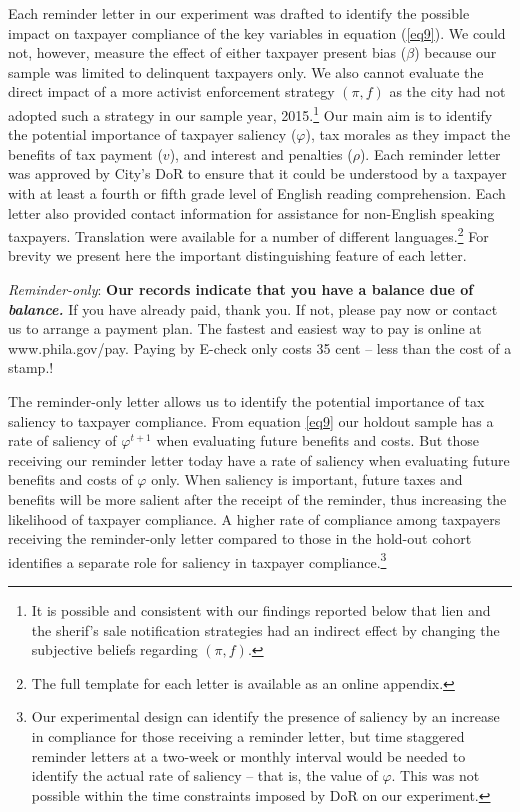 \documentclass[12pt]{article}
\begin{document}
Each reminder letter in our experiment was drafted to identify the
possible impact on taxpayer compliance of the key variables in
equation (\ref{eq9}).  We could not, however, measure the effect of
either taxpayer present bias ($\beta$) because our sample was limited
to delinquent taxpayers only. We also cannot evaluate the direct
impact of a more activist enforcement strategy $(\pi, f)$ as the city
had not adopted such a strategy in our sample year, 2015.\footnote{It
  is possible and consistent with our findings reported below that
  lien and the sherif's sale notification strategies had an indirect
  effect by changing the subjective beliefs regarding $(\pi,f)$.} Our
main aim is to identify the potential importance of taxpayer saliency
($\varphi$), tax morales as they impact the benefits of tax payment
($v$), and interest and penalties ($\rho$).  Each reminder letter was
approved by City's DoR to ensure that it could be understood by a
taxpayer with at least a fourth or fifth grade level of English
reading comprehension.  Each letter also provided contact information
for assistance for non-English speaking taxpayers.  Translation were
available for a number of different languages.\footnote{The full
  template for each letter is available as an online appendix.}  For
brevity we present here the important distinguishing feature of each
letter.

\bigskip

\noindent \textit{Reminder-only}: \textbf{Our records indicate 
that you have a balance due of \textit{balance. }} If you have 
already paid, thank you.  If not, please pay now or contact us 
to arrange a payment plan.  The fastest and easiest way to pay is 
online at  www.phila.gov/pay. Paying by E-check only costs 35 cent 
-- less than the cost of a stamp.!

\bigskip

 The reminder-only letter allows us to identify the potential
 importance of tax saliency to taxpayer compliance.  From equation
 \eqref{eq9} our holdout sample has a rate of saliency of
 $\varphi^{t+1}$ when evaluating future benefits and costs.  But those
 receiving our reminder letter today have a rate of saliency when
 evaluating future benefits and costs of $\varphi$ only.  When
 saliency is important, future taxes and benefits will be more salient
 after the receipt of the reminder, thus increasing the likelihood of
 taxpayer compliance. A higher rate of compliance among taxpayers
 receiving the reminder-only letter compared to those in the hold-out
 cohort identifies a separate role for saliency in taxpayer
 compliance.\footnote{Our experimental design can identify the
   presence of saliency by an increase in compliance for those
   receiving a reminder letter, but time staggered reminder letters at
   a two-week or monthly interval would be needed to identify the
   actual rate of saliency -- that is, the value of $\varphi$.  This
   was not possible within the time constraints imposed by DoR on our
   experiment.  }
   
\end{document}
